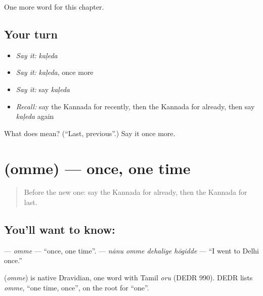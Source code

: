 \begin{grammarlens}[title={What you've built}]
One more word for this chapter.
\end{grammarlens}

\subsection*{Your turn}
\begin{itemize}
\raggedright
  \item \emph{Say it:} \emph{kaḷeda}
  \item \emph{Say it:} \emph{kaḷeda}, once more
  \item \emph{Say it:} say \emph{kaḷeda}
  \item \emph{Recall:} say the Kannada for recently, then the Kannada for already, then say \emph{kaḷeda} again
\end{itemize}

\begin{tcolorbox}[breakable,colback=teal!4,colframe=teal!35!black,title={Before you move on}]
What does  mean? (\textquotedblleft{}Last, previous\textquotedblright{}.) Say it once more.
\end{tcolorbox}
\section[\texorpdfstring{\kn{ಒಮ್ಮೆ} (omme)}{ಒಮ್ಮೆ (omme)}]{ (omme) — once, one time}

\label{lesson:KA-C155-omme}



\begin{quote}
Before the new one: say the Kannada for already, then the Kannada for last.
\end{quote}

\subsection*{You'll want to know: }
\textbf{} — \emph{omme} — \textquotedblleft{}once, one time\textquotedblright{}. \textbf{   } — \emph{nānu omme dehalige hōgidde} — \textquotedblleft{}I went to Delhi once.\textquotedblright{}

\begin{cousinweb}
\textbf{} (\emph{omme}) is native Dravidian, one word with Tamil \emph{oru} (DEDR 990). DEDR lists \emph{omme}, \textquotedblleft{}one time, once\textquotedblright{}, on the root for \textquotedblleft{}one\textquotedblright{}.
\end{cousinweb}

